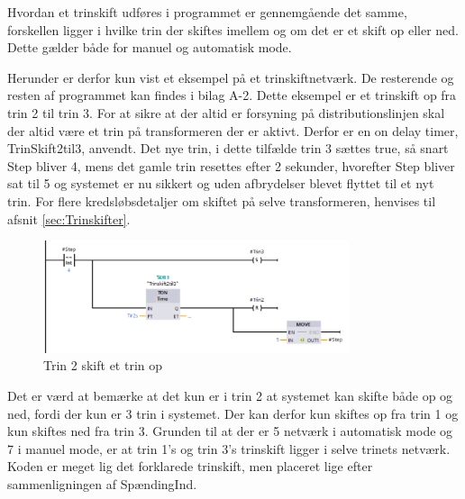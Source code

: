 Hvordan et trinskift udføres i programmet er gennemgående det samme, forskellen ligger i hvilke trin der skiftes imellem og om det er et skift op eller ned. Dette gælder både for manuel og automatisk mode.

Herunder er derfor kun vist et eksempel på et trinskiftnetværk. De resterende og resten af programmet kan findes i bilag A-2. Dette eksempel er et trinskift op fra trin 2 til trin 3. For at sikre at der altid er forsyning på distributionslinjen skal der altid være et trin på transformeren der er aktivt. Derfor er en on delay timer, TrinSkift2til3, anvendt. Det nye trin, i dette tilfælde trin 3 sættes true, så snart Step bliver 4, mens det gamle trin resettes efter 2 sekunder, hvorefter Step bliver sat til 5 og systemet er nu sikkert og uden afbrydelser blevet flyttet til et nyt trin. For flere kredsløbsdetaljer om skiftet på selve transformeren, henvises til afsnit \ref{sec:Trinskifter}.

\begin{figure}[H] %
	\centering
	\includegraphics[width=0.8\textwidth]{Figure/Trin2SkiftOp}
	\caption{Trin 2 skift et trin op}
	\label{fig:Trin2SkiftOp}
\end{figure}

Det er værd at bemærke at det kun er i trin 2 at systemet kan skifte både op og ned, fordi der kun er 3 trin i systemet. Der kan derfor kun skiftes op fra trin 1 og kun skiftes ned fra trin 3. Grunden til at der er 5 netværk i automatisk mode og 7 i manuel mode, er at trin 1's og trin 3's trinskift ligger i selve trinets netværk. Koden er meget lig det forklarede trinskift, men placeret lige efter sammenligningen af SpændingInd.